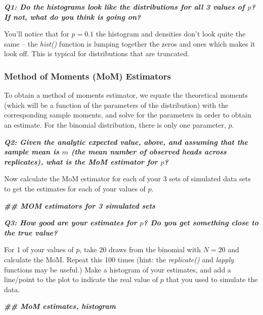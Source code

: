 \documentclass[
]{article}
\newenvironment{Shaded}{\begin{snugshade}}{\end{snugshade}}
\newcommand{\DocumentationTok}[1]{\textcolor[rgb]{0.56,0.35,0.01}{\textbf{\textit{#1}}}}
\begin{document}
\textbf{\emph{Q1: Do the histograms look like the distributions for all
3 values of \(p\)? If not, what do you think is going on?}}

You'll notice that for \(p=0.1\) the histogram and densities don't look
quite the same -- the \emph{hist()} function is lumping together the
zeros and ones which makes it look off. This is typical for
distributions that are truncated.

\hypertarget{method-of-moments-mom-estimators}{%
\subsubsection{Method of Moments (MoM)
Estimators}\label{method-of-moments-mom-estimators}}

To obtain a method of moments estimator, we equate the theoretical
moments (which will be a function of the parameters of the distribution)
with the corresponding sample moments, and solve for the parameters in
order to obtain an estimate. For the binomial distribution, there is
only one parameter, \(p\).

\textbf{\emph{Q2: Given the analytic expected value, above, and assuming
that the sample mean is \(m\) (the mean number of observed heads across
replicates), what is the MoM estimator for \(p\)?}}

Now calculate the MoM estimator for each of your 3 sets of simulated
data sets to get the estimates for each of your values of \(p\).

\begin{Shaded}
\begin{Highlighting}[]
\DocumentationTok{\#\# MOM estimators for 3 simulated sets}
\end{Highlighting}
\end{Shaded}

\textbf{\emph{Q3: How good are your estimates for \(p\)? Do you get
something close to the true value?}}

For 1 of your values of \(p\), take 20 draws from the binomial with
\(N=20\) and calculate the MoM. Repeat this 100 times (hint: the
\emph{replicate()} and \emph{lapply} functions may be useful.) Make a
histogram of your estimates, and add a line/point to the plot to
indicate the real value of \(p\) that you used to simulate the data.

\begin{Shaded}
\begin{Highlighting}[]
\DocumentationTok{\#\# MoM estimates, histogram }
\end{Highlighting}
\end{Shaded}
\end{document}
